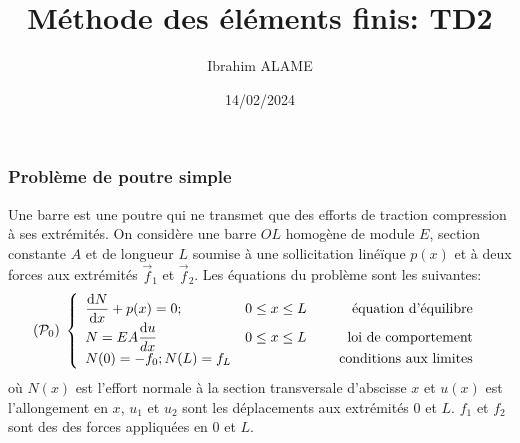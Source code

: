 \documentclass{article}
\title{Méthode des éléments finis: TD2}
\author{Ibrahim ALAME}
\date{14/02/2024}
\def \de {{\rm d}}
\begin{document}
\maketitle
\subsubsection*{Problème de poutre simple}
Une barre est une poutre qui ne transmet que des efforts de traction compression à ses extrémités. On considère une barre $OL$ homogène de module $E$, section constante $A$ et de longueur $L$ soumise à une sollicitation linéïque  $p(x)$ et à deux forces aux extrémités $\vec{f}_1$ et $\vec{f}_2$. Les équations du problème sont les suivantes:
\[
({\cal P}_0)\;\left\{
\begin{array}{lcr}
\displaystyle \frac{\de N}{\de x}+p(x)=0;&0\leq x\leq L &\mbox{ équation d'équilibre } \\
N=EA\displaystyle \frac{\de u}{dx}& 0\leq x\leq L&\mbox{ loi de comportement } \\
N(0)=-f_0 ;N(L)=f_L&&\quad\mbox{ conditions aux limites } 
\end{array}
\right.
\]
où $N(x)$ est l'effort normale à la section transversale d'abscisse $x$ et $u(x)$ est l'allongement en $x$, $u_1$ et $u_2$ sont les déplacements aux extrémités $0$ et $L$. $f_1$ et $f_2$ sont des des forces appliquées en $0$ et $L$.
\begin{center}
\end{center}
\end{document}
